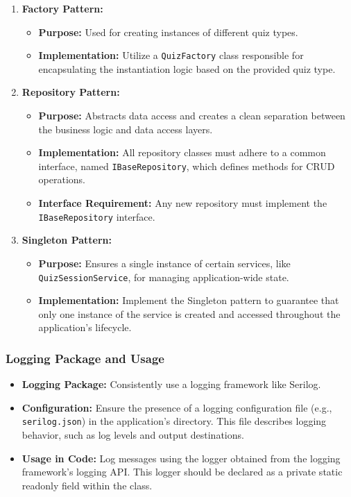 \documentclass{article}
\begin{document}
\begin{enumerate}[label= \arabic*.] \item \textbf{Factory Pattern:} \begin{itemize}[label=$\bullet$] \item \textbf{Purpose:} Used for creating instances of different quiz types. \item \textbf{Implementation:} Utilize a \texttt{QuizFactory} class responsible for encapsulating the instantiation logic based on the provided quiz type. \end{itemize}

\item \textbf{Repository Pattern:} \begin{itemize}[label=$\bullet$] \item \textbf{Purpose:} Abstracts data access and creates a clean separation between the business logic and data access layers. \item \textbf{Implementation:} All repository classes must adhere to a common interface, named \texttt{IBaseRepository}, which defines methods for CRUD operations. \item \textbf{Interface Requirement:} Any new repository must implement the \texttt{IBaseRepository} interface. \end{itemize}

\item \textbf{Singleton Pattern:} \begin{itemize}[label=$\bullet$] \item \textbf{Purpose:} Ensures a single instance of certain services, like \texttt{QuizSessionService}, for managing application-wide state. \item \textbf{Implementation:} Implement the Singleton pattern to guarantee that only one instance of the service is created and accessed throughout the application's lifecycle. \end{itemize}

\end{enumerate}

\subsubsection{Logging Package and Usage}

\begin{itemize}[label=$\bullet$] \item \textbf{Logging Package:} Consistently use a logging framework like Serilog. \item \textbf{Configuration:} Ensure the presence of a logging configuration file (e.g., \texttt{serilog.json}) in the application's directory. This file describes logging behavior, such as log levels and output destinations. \item \textbf{Usage in Code:} Log messages using the logger obtained from the logging framework's logging API. This logger should be declared as a private static readonly field within the class. \end{itemize}
\end{document}

